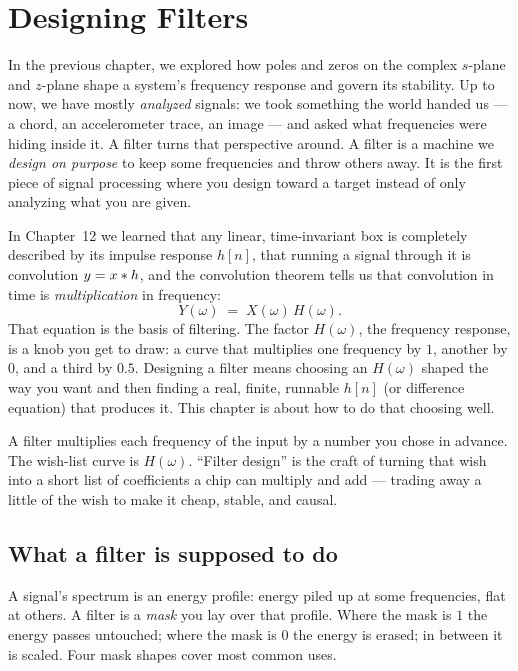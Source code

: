\chapter{Designing Filters}

In the previous chapter, we explored how poles and zeros on the complex $s$-plane
and $z$-plane shape a system's frequency response and govern its stability.
Up to now, we have mostly \emph{analyzed} signals: we took something the world
handed us --- a chord, an accelerometer trace, an image --- and asked what
frequencies were hiding inside it. A filter turns that perspective around. A filter is a
machine we \emph{design on purpose} to keep some frequencies and throw others
away. It is the first piece of signal processing where you design toward a
target instead of only analyzing what you are given.

In Chapter~12 we learned that
any linear, time-invariant box is completely described by its impulse response
$h[n]$, that running a signal through it is convolution $y = x \ast h$, and
the convolution theorem tells us that convolution in time is \emph{multiplication} in frequency:
\[
Y(\omega) \;=\; X(\omega)\, H(\omega).
\]
That equation is the basis of filtering. The factor $H(\omega)$,
the frequency response, is a knob you get to draw: a curve that multiplies
one frequency by $1$, another by $0$, and a third by $0.5$. Designing a filter
means choosing an $H(\omega)$ shaped the way you want and then finding a real,
finite, runnable $h[n]$ (or difference equation) that produces it. This chapter
is about how to do that choosing well.

\begin{focusbox}
A filter multiplies each frequency of the input by a number you chose in advance.
The wish-list curve is $H(\omega)$. ``Filter design'' is the craft of turning that
wish into a short list of coefficients a chip can multiply and add ---
trading away a little of the wish to make it cheap, stable, and causal.
\end{focusbox}

\section{What a filter is supposed to do}
\label{ch16:what}

A signal's spectrum is an
energy profile: energy piled up at some frequencies, flat at others. A filter is a
\emph{mask} you lay over that profile. Where the mask is $1$ the energy passes
untouched; where the mask is $0$ the energy is erased; in between it is scaled.
Four mask shapes cover most common uses.

